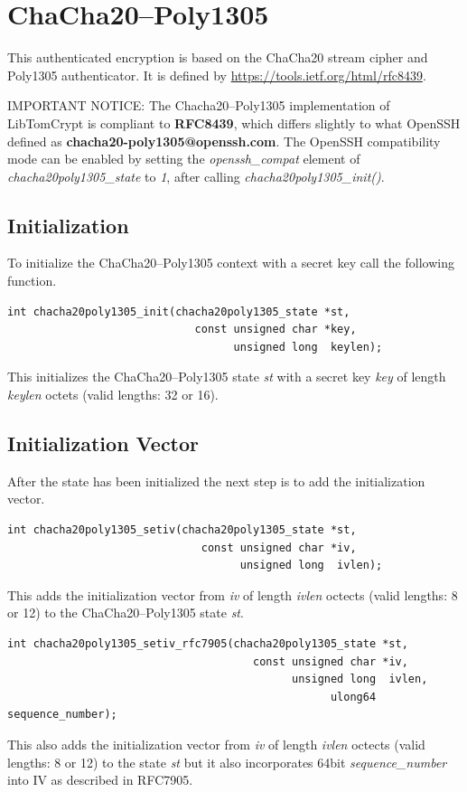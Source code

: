 \documentclass[synpaper]{book}
\newcommand{\mysection}[1]    %
	{                   %
	\section{#1}
   \markboth{\textsf{www.libtom.net}}{\thesection ~ {#1}}
	}
\begin{document}
\mysection{ChaCha20--Poly1305}
\label{chacha20poly1305}

This authenticated encryption is based on the ChaCha20 stream cipher and Poly1305 authenticator.
It is defined by \url{https://tools.ietf.org/html/rfc8439}.

IMPORTANT NOTICE: The Chacha20--Poly1305 implementation of LibTomCrypt is compliant to \textbf{RFC8439}, which differs slightly
to what OpenSSH defined as \textbf{chacha20-poly1305@openssh.com}. The OpenSSH compatibility mode can be enabled
by setting the \textit{openssh\_compat} element of \textit{chacha20poly1305\_state} to \textit{1},
after calling \textit{chacha20poly1305\_init()}.

\subsection{Initialization}
To initialize the ChaCha20--Poly1305 context with a secret key call the following function.

\begin{verbatim}
int chacha20poly1305_init(chacha20poly1305_state *st,
                             const unsigned char *key,
                                   unsigned long  keylen);
\end{verbatim}
This initializes the ChaCha20--Poly1305 state \textit{st} with a secret key \textit{key} of length \textit{keylen}
octets (valid lengths: 32 or 16).

\subsection{Initialization Vector}
After the state has been initialized the next step is to add the initialization vector.

\begin{verbatim}
int chacha20poly1305_setiv(chacha20poly1305_state *st,
                              const unsigned char *iv,
                                    unsigned long  ivlen);
\end{verbatim}
This adds the initialization vector from \textit{iv} of length \textit{ivlen} octects (valid lengths: 8 or 12) to
the ChaCha20--Poly1305 state \textit{st}.

\begin{verbatim}
int chacha20poly1305_setiv_rfc7905(chacha20poly1305_state *st,
                                      const unsigned char *iv,
                                            unsigned long  ivlen,
                                                  ulong64  sequence_number);
\end{verbatim}
This also adds the initialization vector from \textit{iv} of length \textit{ivlen} octects (valid lengths: 8 or 12) to
the state \textit{st} but it also incorporates 64bit \textit{sequence\_number} into IV as described in RFC7905.
\end{document}
